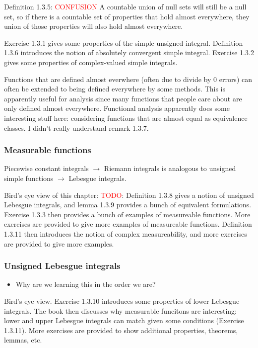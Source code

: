 \documentclass[answers,12pt]{exam}
\begin{document}
Definition 1.3.5: 
\textcolor{red}{CONFUSION} A countable union of null sets will still be a null set, so if there is a countable set of properties that hold almost everywhere, they union of those properties will also hold almost everywhere.

Exercise 1.3.1 gives some properties of the simple unsigned integral.
Definition 1.3.6 introduces the notion of absolutely convergent simple integral.
Exercise 1.3.2 gives some properties of complex-valued simple integrals.

Functions that are defined almost everwhere (often due to divide by 0 errors) can often be extended to being defined everywhere by some methods.
This is apparently useful for analysis since many functions that people care about are only defined almost everywhere.
Functional analysis apparently does some interesting stuff here: considering functions that are almost equal as equivalence classes.
I didn't really understand remark 1.3.7.

\subsubsection{Measurable functions}
Piecewise constant integrals $\to$ Riemann integrals is analogous to unsigned simple functions $\to$ Lebesgue integrals.

Bird's eye view of this chapter:
\textcolor{red}{TODO}: Definition 1.3.8 gives a notion of unsigned Lebesgue integrals, and lemma 1.3.9 provides a bunch of equivalent formulations.
Exercise 1.3.3 then provides a bunch of examples of measureable functions.
More exercises are provided to give more examples of measureable functions.
Definition 1.3.11 then introduces the notion of complex measureability, and more exercises are provided to give more examples.

\subsubsection{Unsigned Lebesgue integrals}
\begin{itemize}
    \item Why are we learning this in the order we are?
\end{itemize}

Bird's eye view.
Exercise 1.3.10 introduces some properties of lower Lebesgue integrals.
The book then discusses why measurable funcitons are interesting: lower and upper Lebesgue integrals can match given some conditions (Exercise 1.3.11).
More exercises are provided to show additional properties, theorems, lemmas, etc.
\end{document}

